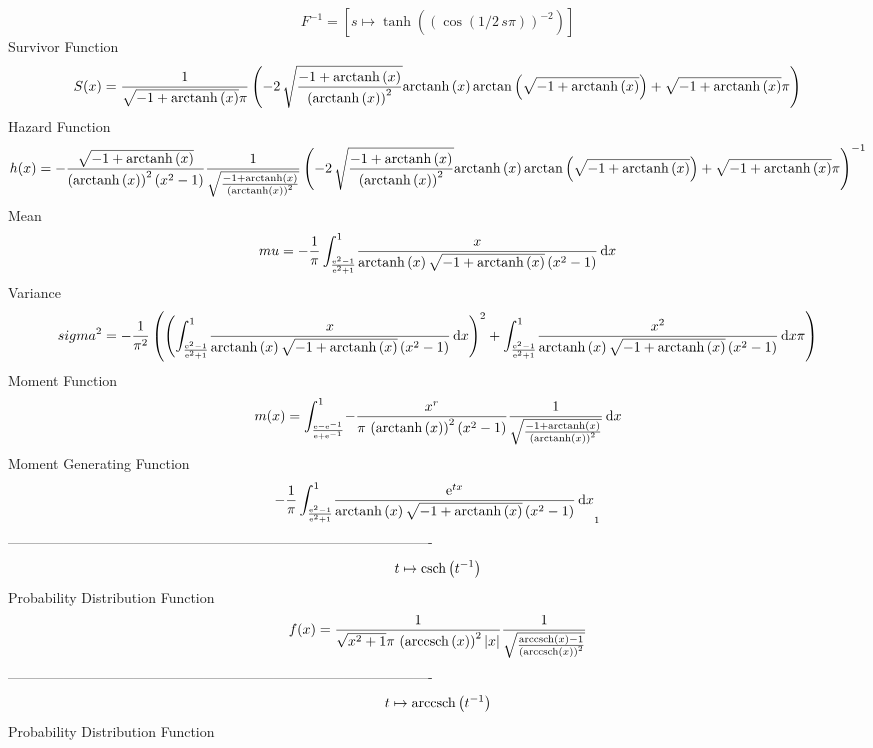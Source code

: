 \documentclass[12pt]{article}
\begin{document}
  $$F^{-1} = [s\mapsto \tanh \left(  \left( \cos \left( 1/2\,s\pi \right)  \right) 
^{-2} \right) ]
$$Survivor Function 
 $$ S(x)={\frac {1}{\sqrt {-1+{\rm arctanh} \left(x\right)}\pi} \left( -2\,
\sqrt {{\frac {-1+{\rm arctanh} \left(x\right)}{ \left( {\rm arctanh} 
\left(x\right) \right) ^{2}}}}{\rm arctanh} \left(x\right)\arctan
 \left( \sqrt {-1+{\rm arctanh} \left(x\right)} \right) +\sqrt {-1+
{\rm arctanh} \left(x\right)}\pi \right) }
$$ Hazard Function 
 $$ h(x)=-{\frac {\sqrt {-1+{\rm arctanh} \left(x\right)}}{ \left( 
{\rm arctanh} \left(x\right) \right) ^{2} \left( {x}^{2}-1 \right) }{
\frac {1}{\sqrt {{\frac {-1+{\rm arctanh} \left(x\right)}{ \left( 
{\rm arctanh} \left(x\right) \right) ^{2}}}}}} \left( -2\,\sqrt {{
\frac {-1+{\rm arctanh} \left(x\right)}{ \left( {\rm arctanh} \left(x
\right) \right) ^{2}}}}{\rm arctanh} \left(x\right)\arctan \left( 
\sqrt {-1+{\rm arctanh} \left(x\right)} \right) +\sqrt {-1+
{\rm arctanh} \left(x\right)}\pi \right) ^{-1}}
$$ Mean 
 $$ mu=-{\frac {1}{\pi}\int_{{\frac {{{\rm e}^{2}}-1}{{{\rm e}^{2}}+1}}}^{1}
\!{\frac {x}{{\rm arctanh} \left(x\right)\sqrt {-1+{\rm arctanh} 
\left(x\right)} \left( {x}^{2}-1 \right) }}\,{\rm d}x}
$$ Variance 
 $$ sigma^2 = -{\frac {1}{{\pi}^{2}} \left(  \left( \int_{{\frac {{{\rm e}^{2}}-1}{{
{\rm e}^{2}}+1}}}^{1}\!{\frac {x}{{\rm arctanh} \left(x\right)\sqrt {-
1+{\rm arctanh} \left(x\right)} \left( {x}^{2}-1 \right) }}\,{\rm d}x
 \right) ^{2}+\int_{{\frac {{{\rm e}^{2}}-1}{{{\rm e}^{2}}+1}}}^{1}\!{
\frac {{x}^{2}}{{\rm arctanh} \left(x\right)\sqrt {-1+{\rm arctanh} 
\left(x\right)} \left( {x}^{2}-1 \right) }}\,{\rm d}x\pi \right) }
$$ Moment Function 
 $$ m(x) = \int_{{\frac {{\rm e}-{{\rm e}^{-1}}}{{\rm e}+{{\rm e}^{-1}}}}}^{1}\!-
{\frac {{x}^{r}}{\pi\, \left( {\rm arctanh} \left(x\right) \right) ^{2
} \left( {x}^{2}-1 \right) }{\frac {1}{\sqrt {{\frac {-1+{\rm arctanh}
 \left(x\right)}{ \left( {\rm arctanh} \left(x\right) \right) ^{2}}}}}
}}\,{\rm d}x
$$ Moment Generating Function 
 $$-{\frac {1}{\pi}\int_{{\frac {{{\rm e}^{2}}-1}{{{\rm e}^{2}}+1}}}^{1}
\!{\frac {{{\rm e}^{tx}}}{{\rm arctanh} \left(x\right)\sqrt {-1+
{\rm arctanh} \left(x\right)} \left( {x}^{2}-1 \right) }}\,{\rm d}x}_{
{1}}
$$-------------------------------------------------------------------------------------------  \\$$t\mapsto {\rm csch} \left({t}^{-1}\right)
$$Probability Distribution Function 
$$  f(x)={\frac {1}{\sqrt {{x}^{2}+1}\pi\, \left( {\rm arccsch} \left(x\right)
 \right) ^{2} \left| x \right| }{\frac {1}{\sqrt {{\frac {
{\rm arccsch} \left(x\right)-1}{ \left( {\rm arccsch} \left(x\right)
 \right) ^{2}}}}}}}
$$-------------------------------------------------------------------------------------------  \\$$t\mapsto {\rm arccsch} \left({t}^{-1}\right)
$$Probability Distribution Function 
\end{document}
